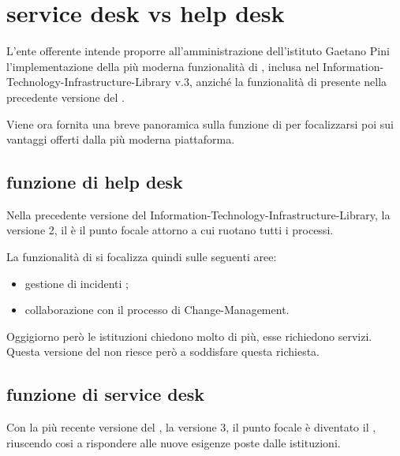 %
%
\section[Service Desk vs Help Desk]{service desk vs help desk}
\label{sd-sd-vs-hd}
L'ente offerente intende proporre all'amministrazione dell'istituto Gaetano Pini l'implementazione della più moderna funzionalità di , inclusa nel  \ac{Information-Technology-Infrastructure-Library} v.3, anziché la funzionalità di  presente nella precedente versione del .

Viene ora fornita una breve panoramica sulla funzione di  per focalizzarsi poi sui vantaggi offerti dalla più moderna piattaforma.

\subsection[Funzione di Help Desk]{funzione di help desk}
\label{sd-hd}
Nella precedente versione del  \ac{Information-Technology-Infrastructure-Library}, la versione 2, il  è il punto focale attorno a cui ruotano tutti i processi.

La funzionalità di  si focalizza quindi sulle seguenti aree:
\begin{itemize}
\item{gestione di incidenti ;}
\item{collaborazione con il processo di \ac{Change-Management}.}
\end{itemize}

Oggigiorno però le istituzioni chiedono molto di più, esse richiedono servizi. Questa versione del  non riesce però a soddisfare questa richiesta.

\subsection[Funzione di Service Desk]{funzione di service desk}
\label{sd-sd}
Con la più recente versione del , la versione 3, il punto focale è diventato il , riuscendo cosi a rispondere alle nuove esigenze poste dalle istituzioni.

